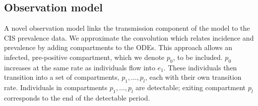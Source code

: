 \documentclass[9pt,twocolumn,twoside]{pnas-new}
\begin{document}
\subsection*{Observation model} \label{SEIR:sec:observation}

A novel observation model links the transmission component of the model to the CIS prevalence data. We approximate the convolution which relates incidence and prevalence by adding compartments to the ODEs.
This approach allows an infected, pre-positive compartment, which we denote $p_0$, to be included. $p_0$ increases at the same rate as individuals flow into $e_1$.
These individuals then transition into a set of compartments, $p_1, \dots, p_l$, each with their own transition rate.
Individuals in compartments $p_1, \dots, p_l$ are detectable; exiting compartment $p_l$ corresponds to the end of the detectable period.
\end{document}
